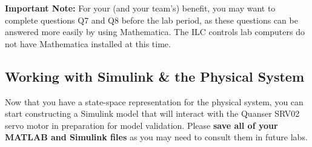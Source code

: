 \documentclass[12pt]{report}
\newcommand\drew[1]{\textcolor{red}{#1}}
\begin{document}
\begin{enumerate}
          \textbf{Important Note:} For your (and your team's) benefit, you may want to complete questions Q7 and Q8 before the lab period, as these questions can be answered more easily by using Mathematica. The ILC controls lab computers do not have Mathematica installed at this time. \\
\end{enumerate}
\subsection{Working with Simulink \& the Physical System}\label{subsection:lab1_simulink}
Now that you have a state-space representation for the physical system, you can start constructing a Simulink model that will interact with the Quanser SRV02 servo motor in preparation for model validation. Please \textbf{save all of your MATLAB and Simulink files} as you may need to consult them in future labs.
\end{document}
